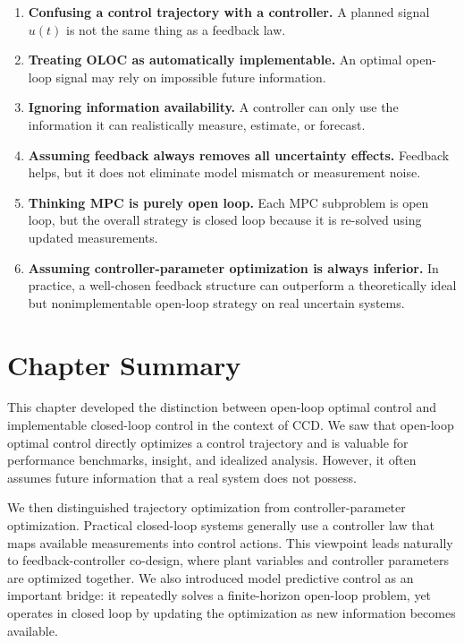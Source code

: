 \documentclass[11pt]{article}
\begin{document}
\begin{enumerate}[leftmargin=1.5em]
  \item \textbf{Confusing a control trajectory with a controller.} A planned signal $u(t)$ is not the same thing as a feedback law.
  \item \textbf{Treating OLOC as automatically implementable.} An optimal open-loop signal may rely on impossible future information.
  \item \textbf{Ignoring information availability.} A controller can only use the information it can realistically measure, estimate, or forecast.
  \item \textbf{Assuming feedback always removes all uncertainty effects.} Feedback helps, but it does not eliminate model mismatch or measurement noise.
  \item \textbf{Thinking MPC is purely open loop.} Each MPC subproblem is open loop, but the overall strategy is closed loop because it is re-solved using updated measurements.
  \item \textbf{Assuming controller-parameter optimization is always inferior.} In practice, a well-chosen feedback structure can outperform a theoretically ideal but nonimplementable open-loop strategy on real uncertain systems.
\end{enumerate}

\section{Chapter Summary}

This chapter developed the distinction between open-loop optimal control and implementable closed-loop control in the context of CCD. We saw that open-loop optimal control directly optimizes a control trajectory and is valuable for performance benchmarks, insight, and idealized analysis. However, it often assumes future information that a real system does not possess.

We then distinguished trajectory optimization from controller-parameter optimization. Practical closed-loop systems generally use a controller law that maps available measurements into control actions. This viewpoint leads naturally to feedback-controller co-design, where plant variables and controller parameters are optimized together. We also introduced model predictive control as an important bridge: it repeatedly solves a finite-horizon open-loop problem, yet operates in closed loop by updating the optimization as new information becomes available.
\end{document}
